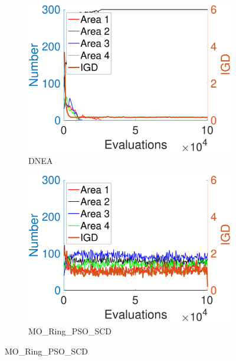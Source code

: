 \documentclass[conference]{IEEEtran}
\begin{document}
\begin{figure}[t!]
    \centering
    \begin{subfigure}[b]{.24\textwidth}
    \includegraphics[width=\linewidth]{Section5/dim4/Diversity/DNEA}
    \caption{DNEA}
    \end{subfigure}
    \begin{subfigure}[b]{.24\textwidth}
    \includegraphics[width=\linewidth]{Section5/dim4/Diversity/MO_Ring_PSO_SCD}
    \caption{MO\_Ring\_PSO\_SCD}
    \end{subfigure}
    

\end{figure}
\end{document}
